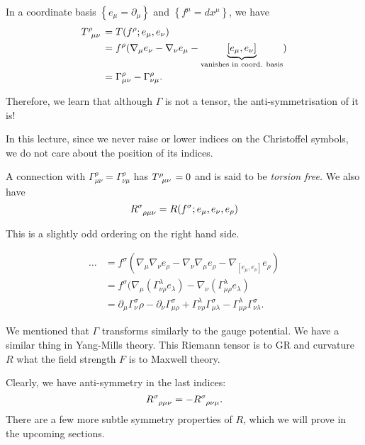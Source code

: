 In a coordinate basis $\left\{ e_\mu = \partial_\mu \right\} $ and $\left\{ f^\mu = dx^\mu \right\}$, we have
\begin{align}
  T \indices{^\rho_\mu_\nu} &= T(f^\rho; e_\mu, e_\nu) \\
			    &= f^\rho (\nabla_{\mu} e_\nu - \nabla_{\nu} e_\mu - \underbrace{[e_\mu, e_\nu]}_{\text{vanishes in coord. basis}}) \\
			    &= \Gamma^\rho_{\mu\nu} - \Gamma^\rho_{\nu\mu}.
\end{align}
\begin{leftbar}
  \begin{remark}
    Therefore, we learn that although $\Gamma$ is not a tensor, the anti-symmetrisation of it is!
  \end{remark}
\end{leftbar}
\begin{leftbar}
  \begin{remark}
    In this lecture, since we never raise or lower indices on the Christoffel symbols, we do not care about the position of its indices.
  \end{remark}
\end{leftbar}
A connection with $\Gamma^\rho_{\mu\nu} = \Gamma^\rho_{\nu\mu}$ has $T \indices{^\rho_\mu_\nu} = 0$ and is said to be \emph{torsion free.}
We also have
\begin{equation}
  R \indices{^\sigma_\rho_\mu_\nu} = R (f^\sigma; e_\mu, e_\nu, e_\rho)
\end{equation}
\begin{leftbar}
  \begin{remark}
    This is a slightly odd ordering on the right hand side.
  \end{remark}
\end{leftbar}
\begin{align}
  \dots &= f^\sigma \left( \nabla_{\mu} \nabla_{\nu} e_\rho - \nabla_{\nu} \nabla_{\mu} e_\rho - \nabla_{[e_\mu, e_\nu]} e_\rho \right) \\
	&= f^\sigma (\nabla_{\mu} (\Gamma^\lambda_{\nu\rho} e_\lambda) - \nabla_{\nu} (\Gamma^\lambda_{\mu\rho} e_\lambda) \\
	&=\partial_\mu \Gamma^\sigma_\nu\rho - \partial_\nu \Gamma^\sigma_{\mu\rho} + \Gamma^\lambda_{\nu\rho} \Gamma^\sigma_{\mu\lambda} - \Gamma^\lambda_{\mu\rho} \Gamma^\sigma_{\nu\lambda}.
\end{align}
\begin{leftbar}
  \begin{remark}
    We mentioned that $\Gamma$ transforms similarly to the gauge potential. We have a similar thing in Yang-Mills theory. This Riemann tensor is to GR and curvature $R$ what the field strength $F$ is to Maxwell theory.
  \end{remark}
\end{leftbar}
Clearly, we have anti-symmetry in the last indices:
\begin{equation}
  R \indices{^\sigma_\rho_\mu_\nu} = -R \indices{^\sigma_\rho_\nu_\mu}.
\end{equation}
There are a few more subtle symmetry properties of $R$, which we will prove in the upcoming sections.

